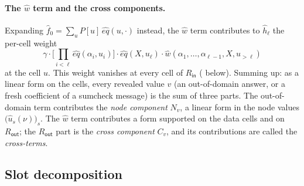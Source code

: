 \documentclass{article}
\theoremstyle{definition}
\begin{document}
\paragraph{The $\hat{w}$ term and the cross components.} Expanding $\hat{f}_0 = \sum_u P[u]\, \hat{eq}(u, \cdot)$ instead, the $\hat{w}$ term contributes to $\hat{h}_\ell$ the per-cell weight
\[
\gamma \cdot \Big[\prod_{i < \ell} \hat{eq}(\alpha_i, u_i)\Big] \cdot \hat{eq}(X, u_\ell) \cdot \hat{w}(\alpha_1, \dots, \alpha_{\ell-1}, X, u_{> \ell})
\]
at the cell $u$. This weight vanishes at every cell of $R_{\mathsf{in}}$ ( below). Summing up: as a linear form on the cells, every revealed value $v$ (an out-of-domain answer, or a fresh coefficient of a sumcheck message) is the sum of three parts. The out-of-domain term contributes the \emph{node component} $N_v$, a linear form in the node values $\big(\hat{u}_s(\nu)\big)_s$. The $\hat{w}$ term contributes a form supported on the data cells and on $R_{\mathsf{out}}$; the $R_{\mathsf{out}}$ part is the \emph{cross component} $C_v$, and its contributions are called the \emph{cross-terms}.

\subsection{Slot decomposition}\label{sec:slot}
\end{document}

